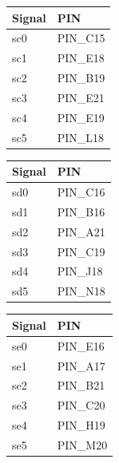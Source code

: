 \documentclass{article}
\begin{document}
\begin{table}[htbp]
  \centering

  \begin{minipage}[t]{0.3\textwidth}
    \centering
    \begin{tabular}{ll}
    \textbf{Signal} & \textbf{PIN} \\
    \hline
    sc0   & PIN\_C15 \\
    sc1   & PIN\_E18 \\
    sc2   & PIN\_B19 \\
    sc3   & PIN\_E21 \\
    sc4   & PIN\_E19 \\
    sc5   & PIN\_L18 \\
    \end{tabular}%
    \label{tab:pin_assignments4}%
  \end{minipage}\hfill
  \begin{minipage}[t]{0.3\textwidth}
    \centering
    \begin{tabular}{ll}
    \textbf{Signal} & \textbf{PIN} \\
    \hline
    sd0   & PIN\_C16 \\
    sd1   & PIN\_B16 \\
    sd2   & PIN\_A21 \\
    sd3   & PIN\_C19 \\
    sd4   & PIN\_J18 \\
    sd5   & PIN\_N18 \\
    \end{tabular}%
    \label{tab:pin_assignments5}%
  \end{minipage}\hfill
  \begin{minipage}[t]{0.3\textwidth}
    \centering
    \begin{tabular}{ll}
    \textbf{Signal} & \textbf{PIN} \\
    \hline
    se0   & PIN\_E16 \\
    se1   & PIN\_A17 \\
    se2   & PIN\_B21 \\
    se3   & PIN\_C20 \\
    se4   & PIN\_H19 \\
    se5   & PIN\_M20 \\
    \end{tabular}%
    \label{tab:pin_assignments6}%
  \end{minipage}
  
\end{table}
\end{document}

